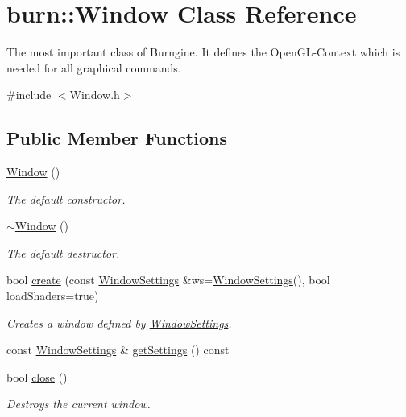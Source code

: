 \hypertarget{classburn_1_1_window}{\section{burn\-:\-:Window Class Reference}
\label{classburn_1_1_window}
}


The most important class of Burngine. It defines the Open\-G\-L-\/\-Context which is needed for all graphical commands.  




{\ttfamily \#include $<$Window.\-h$>$}

\subsection*{Public Member Functions}
\begin{DoxyCompactItemize}
\item 
\hyperlink{classburn_1_1_window_acc7f6464e1ed22854f41342becb51e62}{Window} ()
\begin{DoxyCompactList}\small\item\em The default constructor. \end{DoxyCompactList}\item 
\hyperlink{classburn_1_1_window_a47bd487f48808cab78faa5713e15f0c3}{$\sim$\-Window} ()
\begin{DoxyCompactList}\small\item\em The default destructor. \end{DoxyCompactList}\item 
bool \hyperlink{classburn_1_1_window_a6b8ac2866e1997d479becef84b3a4cf2}{create} (const \hyperlink{classburn_1_1_window_settings}{Window\-Settings} \&ws=\hyperlink{classburn_1_1_window_settings}{Window\-Settings}(), bool load\-Shaders=true)
\begin{DoxyCompactList}\small\item\em Creates a window defined by \hyperlink{classburn_1_1_window_settings}{Window\-Settings}. \end{DoxyCompactList}\item 
const \hyperlink{classburn_1_1_window_settings}{Window\-Settings} \& \hyperlink{classburn_1_1_window_ab6e9cc9ecfcdcd8b835985e87df6ff2f}{get\-Settings} () const 
\item 
bool \hyperlink{classburn_1_1_window_a1bed3eba8c1da3f0a58a3ed5de2c1071}{close} ()
\begin{DoxyCompactList}\small\item\em Destroys the current window. \end{DoxyCompactList}\item 

\end{DoxyCompactItemize}
